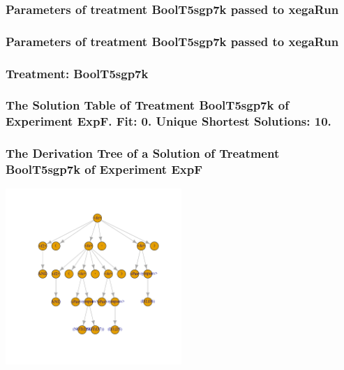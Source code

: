 \documentclass[18pt,c]{beamer}
\begin{document}

 \begin{frame}
 \fontsize{8pt}{9pt}\selectfont
 \frametitle{  Parameters of treatment BoolT5sgp7k passed to xegaRun
 }

 \label{ExpFtParmTable034.tex}  
 \end{frame}


 \begin{frame}
 \fontsize{8pt}{9pt}\selectfont
 \frametitle{  Parameters of treatment BoolT5sgp7k passed to xegaRun
 }

 \label{ExpFtParmTable035.tex}  
 \end{frame}

 \begin{frame}
 \fontsize{8pt}{9pt}\selectfont
 \frametitle{ Treatment: BoolT5sgp7k }

 \label{ExpFStatsTable014.tex}  
 \end{frame}

 \begin{frame}
 \fontsize{8pt}{9pt}\selectfont
 \frametitle{ The Solution Table of Treatment BoolT5sgp7k of Experiment ExpF. Fit: 0. Unique Shortest Solutions: 10. }

 \label{ExpFSolutionTable008.tex}  
 \end{frame}

 \begin{frame}
 \frametitle{ The Derivation Tree of a Solution of Treatment BoolT5sgp7k of Experiment ExpF }
 \begin{center}
\includegraphics[width=0.5\textwidth, angle=0]
{ExpFDerivationTreeFigure008.pdf}
 \end{center}
 \label{report/ExpFDerivationTreeFigure008.pdf}  
 \end{frame}
\end{document}
